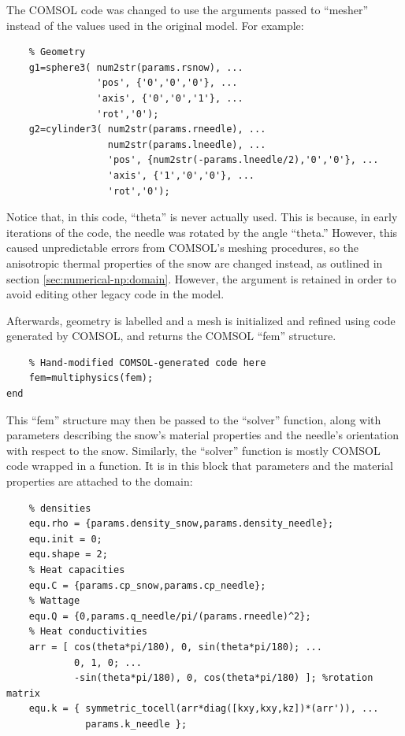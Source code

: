 The COMSOL code was changed to use the arguments passed to ``mesher'' instead of
the values used in the original model. For example:

\small
\begin{verbatim}
    % Geometry
    g1=sphere3( num2str(params.rsnow), ...
                'pos', {'0','0','0'}, ...
                'axis', {'0','0','1'}, ...
                'rot','0');
    g2=cylinder3( num2str(params.rneedle), ...
                  num2str(params.lneedle), ...
                  'pos', {num2str(-params.lneedle/2),'0','0'}, ...
                  'axis', {'1','0','0'}, ...
                  'rot','0');
\end{verbatim}
\normalsize

Notice that, in this code, ``theta'' is never actually used. This is
because, in early iterations of the code, the needle was rotated by the angle
``theta.'' However, this caused unpredictable errors from COMSOL's meshing
procedures, so the anisotropic thermal properties of the snow are changed
instead, as outlined in section \ref{sec:numerical-np:domain}. However, the
argument is retained in order to avoid editing other legacy code in the model.

Afterwards, geometry is labelled and a mesh is initialized and refined using
code generated by COMSOL, and returns the COMSOL ``fem'' structure.

\small
\begin{verbatim}
    % Hand-modified COMSOL-generated code here
    fem=multiphysics(fem);
end
\end{verbatim}
\normalsize

This ``fem'' structure may then be passed to the ``solver'' function, along
with parameters describing the snow's material properties and the needle's
orientation with respect to the snow. Similarly, the ``solver'' function is
mostly COMSOL code wrapped in a function. It is in this block that parameters
and the material properties are attached to the domain:

\small
\begin{verbatim}
    % densities
    equ.rho = {params.density_snow,params.density_needle};
    equ.init = 0;
    equ.shape = 2;
    % Heat capacities
    equ.C = {params.cp_snow,params.cp_needle};
    % Wattage
    equ.Q = {0,params.q_needle/pi/(params.rneedle)^2};
    % Heat conductivities
    arr = [ cos(theta*pi/180), 0, sin(theta*pi/180); ...
            0, 1, 0; ...
            -sin(theta*pi/180), 0, cos(theta*pi/180) ]; %rotation matrix
    equ.k = { symmetric_tocell(arr*diag([kxy,kxy,kz])*(arr')), ...
              params.k_needle };
\end{verbatim}
\normalsize


